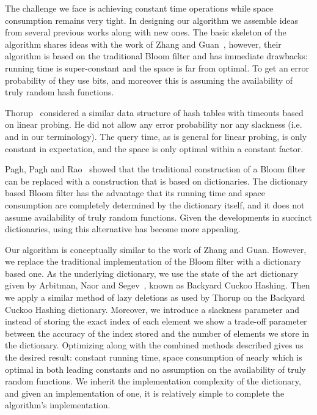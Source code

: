 \documentclass[11pt]{article}
\begin{document}
The challenge we face is achieving constant time operations while space consumption remains very tight. In designing our algorithm we assemble ideas from several previous works along with new ones. The basic skeleton of the algorithm shares ideas with the work of Zhang and Guan~\cite{ZhangG08}, however, their algorithm is based on the traditional Bloom filter and has immediate drawbacks: running time is super-constant and the space is far from optimal. To get an error probability of  they use  bits, and moreover this is assuming the availability of truly random hash functions.

Thorup~\cite{Thorup11} considered a similar data structure of hash tables with timeouts based on linear probing. He did not allow any error probability nor any slackness (i.e.  and  in our terminology). The query time, as is general for linear probing, is only constant in expectation, and the space is only optimal within a constant factor.

Pagh, Pagh and Rao~\cite{PaghPR05} showed that the traditional construction of a Bloom filter can be replaced with a construction that is based on dictionaries. The dictionary based Bloom filter has the advantage that its running time and space consumption are completely determined by the dictionary itself, and it does not assume availability of truly random functions. Given the developments in succinct dictionaries, using this alternative has become more appealing.

Our algorithm is conceptually similar to the work of Zhang and Guan. However, we replace the traditional implementation of the Bloom filter with a dictionary based one. As the underlying dictionary, we use the state of the art dictionary given by Arbitman, Naor and Segev~\cite{ArbitmanNS10}, known as Backyard Cuckoo Hashing. Then we apply a similar method of lazy deletions as used by Thorup on the Backyard Cuckoo Hashing dictionary. Moreover, we introduce a slackness parameter  and instead of storing the exact index of each element we show a trade-off parameter  between the accuracy of the index stored and the number of elements we store in the dictionary. Optimizing  along with the combined methods described gives us the desired result: constant running time, space consumption of nearly  which is optimal in both leading constants and no assumption on the availability of truly random functions. We inherit the implementation complexity of the dictionary, and given an implementation of one, it is relatively simple to complete the algorithm's implementation.
\end{document}
